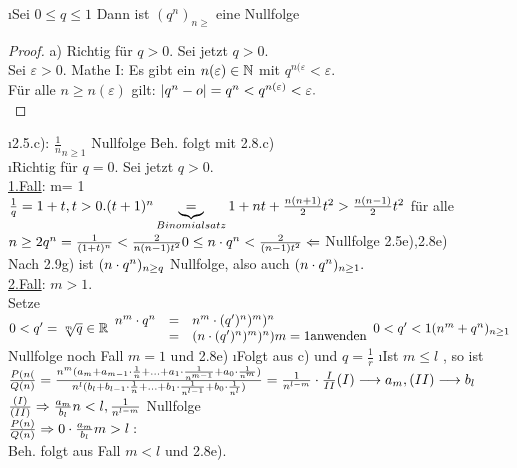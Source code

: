 \begin{enumerate}[a)]
\i Sei $0 \leq q \leq 1$ Dann ist $(q^n)_{n \geq}$ eine Nullfolge\\
\begin{proof}
a) Richtig für $q > 0$. Sei jetzt $q > 0$.\\
Sei $\varepsilon > 0$. Mathe I: Es gibt ein $n(\varepsilon) \in \mathbb{N}$ mit $q^{n(\varepsilon} < \varepsilon.$\\
Für alle $n \geq n(\varepsilon)$ gilt: $\lvert q^{n} -o \rvert = q^n < q^{n(\varepsilon)} < \varepsilon.$\\
\end{proof}
\i 2.5.c): $\frac{1}{n}_{n \geq 1}$ Nullfolge Beh. folgt mit 2.8.c)\\
\i Richtig für $q=0$. Sei jetzt $q > 0$.\\
\underline{1.Fall}: m= 1\\
$\frac{1}{q} = 1+t, t > 0.\\
(t+1)^n \underbrace{=}_{Binomialsatz} 1 + nt + \frac{n(n+1)}{2}t^2 > \frac{n(n-1)}{2}t^2$ für alle $n \geq 2\\
q^n = \frac{1}{(1+t)^n} < \frac{2}{n(n-1)t^2}\\
0 \leq n \cdot q^{n} < \frac{2}{(n-1)t^2} \Leftarrow$ Nullfolge 2.5e),2.8e)\\
Nach 2.9g) ist $(n \cdot q^n)_{n \geq q}$ Nullfolge, also auch $(n \cdot q^n)_{n \geq 1}.$\\
\underline{2.Fall}: $m > 1$.\\
Setze $0 < q' = \sqrt[m]{q} \in \mathbb{R}\\
\begin{array}{rcl}
n^m \cdot q^n &=& n^m \cdot (q')^n)^m)^n\\
&=& (n \cdot (q')^n)^m)^n) m = 1 \text{anwenden}
\end{array}\\
0 < q' < 1\\
(n^m + q^n)_{n \geq 1}$ Nullfolge noch Fall $m=1$ und 2.8e)
\i Folgt aus c) und $q = \frac{1}{r}$
\i Ist $ m \leq l$ , so ist  $\frac{P(n(}{Q(n)} =\frac{n^m(a_m + a_{m-1}\cdot\frac{1}{n} + \ldots + a_1 \cdot \frac{1}{n^{m-1}} + a_0 \cdot \frac{1}{n^m})}{n^l(b_l + b_{l-1}\cdot\frac{1}{n} + \ldots + b_1 \cdot \frac{1}{n^{l-1}} + b_0 \cdot \frac{1}{n^l})}
= \frac{1}{n^{l-m}} \cdot \frac{I}{II}\\
(I) \longrightarrow a_m , (II) \longrightarrow b_l$
$\frac{(I)}{(II)} \Rightarrow \frac{a_m}{b_l}\\
n < l, \frac{1}{n^{l-m}}$ Nullfolge\\
$\frac{P(n)}{Q(n)} \Rightarrow 0 \cdot \frac{a_m}{b_l}\\
m > l:$\\
Beh. folgt aus Fall $m < l$ und 2.8e).
\end{enumerate}
